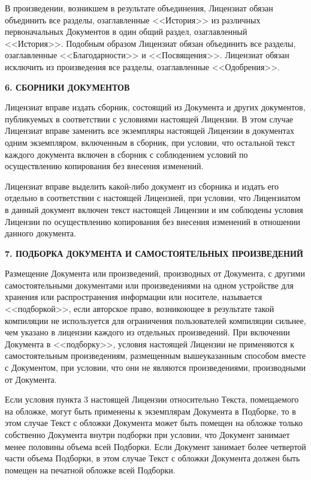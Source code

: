 В произведении, возникшем в результате объединения, Лицензиат обязан
объединить все разделы, озаглавленные <<История>> из различных
первоначальных Документов в один общий раздел, озаглавленный <<История>>.
Подобным образом Лицензиат обязан объединить все разделы, озаглавленные
<<Благодарности>> и <<Посвящения>>. Лицензиат обязан исключить из
произведения все разделы, озаглавленные <<Одобрения>>.


\begin{center}
{\Large\bf 6. СБОРНИКИ ДОКУМЕНТОВ\par}
\end{center}


Лицензиат вправе издать сборник, состоящий из Документа и других
документов, публикуемых в соответствии с условиями настоящей Лицензии.
В этом случае Лицензиат вправе заменить все экземпляры настоящей
Лицензии в документах одним экземпляром, включенным в сборник, при
условии, что остальной текст каждого документа включен в сборник с
соблюдением условий по осуществлению копирования без внесения изменений.

Лицензиат вправе выделить какой-либо документ из сборника и издать его
отдельно в соответствии с настоящей Лицензией, при условии, что
Лицензиатом в данный документ включен текст настоящей Лицензии и им
соблюдены условия Лицензии по осуществлению копирования без внесения
изменений в отношении данного документа.


\begin{center}
{\Large\bf 7. ПОДБОРКА ДОКУМЕНТА И САМОСТОЯТЕЛЬНЫХ ПРОИЗВЕДЕНИЙ\par}
\end{center}


Размещение Документа или произведений, производных от Документа, с
другими самостоятельными документами или произведениями на одном
устройстве для хранения или распространения информации или носителе,
называется <<подборкой>>, если авторское право, возникоющее в результате
такой компиляции не используется для ограничения пользователей
компиляции сильнее, чем указано в лицензии каждого из отдельных
произведений. При включении Документа в <<подборку>>, условия настоящей
Лицензии не применяются к самостоятельным произведениям, размещенным
вышеуказанным способом вместе с Документом, при условии, что они не
являются произведениями, производными от Документа.

Если условия пункта 3 настоящей Лицензии относительно Текста,
помещаемого на обложке, могут быть применены к экземплярам Документа в
Подборке, то в этом случае Текст с обложки Документа может быть помещен
на обложке только собственно Документа внутри подборки при условии, что
Документ занимает менее половины объема всей Подборки. Если Документ
занимает более четвертой части объема Подборки, в этом случае Текст с
обложки Документа должен быть помещен на печатной обложке всей Подборки.


